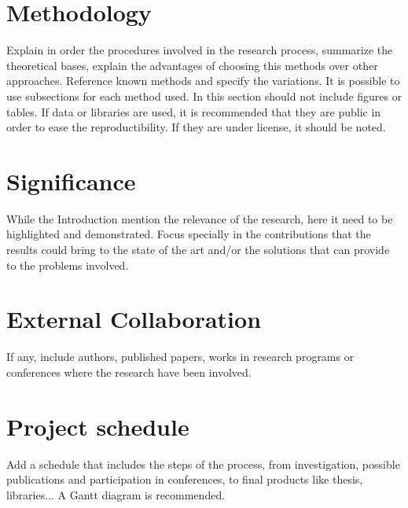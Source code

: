 \documentclass[
  11pt,
  a4paper,
  oneside
]{article}
\begin{document}
\section{Methodology}
Explain in order the procedures involved in the research process, summarize the theoretical bases, explain the advantages of choosing this methods over other approaches. Reference known methods and specify the variations. It is possible to use subsections for each method used. In this section should not include figures or tables. If data or libraries are used, it is recommended that they are public in order to ease the reproductibility. If they are under license, it should be noted.

\section{Significance}
While the Introduction mention the relevance of the research, here it need to be highlighted and demonstrated. Focus specially in the contributions that the results could bring to the state of the art and/or the solutions that can provide to the problems involved.

\section{External Collaboration}

If any, include authors, published papers, works in research programs or conferences where the research have been involved.

\section{Project schedule}
Add a schedule that includes the steps of the process, from investigation, possible publications and participation in conferences, to final products like thesis, libraries... A Gantt diagram is recommended.

\nocite{usc, uw, yu, ub, mu, proposal, yale}


\end{document}
